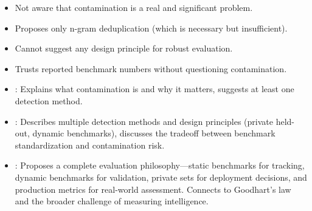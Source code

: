 \begin{interviewq}
\redflags
\begin{itemize}
    \item Not aware that contamination is a real and significant problem.
    \item Proposes only n-gram deduplication (which is necessary but insufficient).
    \item Cannot suggest any design principle for robust evaluation.
    \item Trusts reported benchmark numbers without questioning contamination.
\end{itemize}


\goodgreat
\begin{itemize}
    \item {}: Explains what contamination is and why it matters,
          suggests at least one detection method.
    \item {}: Describes multiple detection methods and design
          principles (private held-out, dynamic benchmarks), discusses the
          tradeoff between benchmark standardization and contamination risk.
    \item {}: Proposes a complete evaluation philosophy---static
          benchmarks for tracking, dynamic benchmarks for validation, private
          sets for deployment decisions, and production metrics for real-world
          assessment.  Connects to Goodhart's law and the broader challenge of
          measuring intelligence.
\end{itemize}

\end{interviewq}

\vspace{0.5em}

